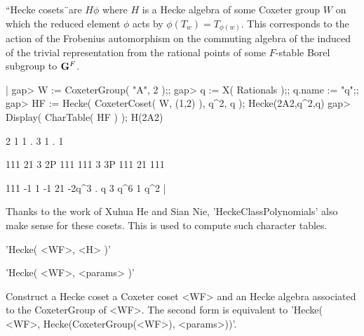 

``Hecke  cosets\"\ are  $H\phi$  where $H$  is a   Hecke algebra  of some
Coxeter   group $W$  on   which   the  reduced  element $\phi$   acts  by
$\phi(T_w)=T_{\phi(w)}$.  This corresponds to the action of the Frobenius
automorphism on  the commuting  algebra  of  the induced of  the  trivial
representation from the rational points of some $F$-stable Borel subgroup
to ${\bf G}^F$.

|    gap> W := CoxeterGroup( "A", 2 );;
    gap> q := X( Rationals );; q.name := "q";;
    gap> HF := Hecke( CoxeterCoset( W, (1,2) ), q^2, q );
    Hecke(2A2,q^2,q)
    gap> Display( CharTable( HF ) );
    H(2A2)

         2     1   1   .
         3     1   .   1

             111  21   3
        2P   111 111   3
        3P   111  21 111

    111       -1   1  -1
    21     -2q^3   .   q
    3        q^6   1 q^2
    |

Thanks  to the work of Xuhua  He and Sian Nie, 'HeckeClassPolynomials' also
make sense for these cosets. This is used to compute such character tables.


'Hecke( <WF>, <H> )'

'Hecke( <WF>, <params> )'

Construct  a  Hecke coset  a Coxeter   coset  <WF> and  an Hecke  algebra
associated to the CoxeterGroup of <WF>. The  second form is equivalent to
'Hecke( <WF>, Hecke(CoxeterGroup(<WF>), <params>))'.



